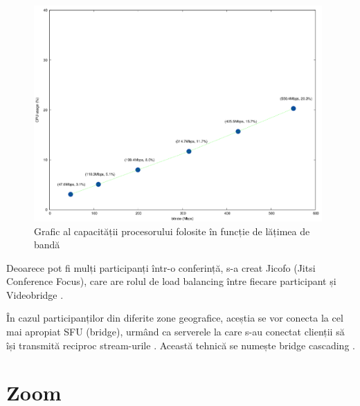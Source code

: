 \begin{figure}[H]
    \centering
    \includegraphics[width=11cm,trim={0 0 0 3cm}, clip]{figures/jitsi_videobridge_cpu.png}
    \caption{Grafic al capacității procesorului folosite în funcție de lățimea de bandă}
    \label{JitsiVideobridgeCPU}
\end{figure}
\indent \par Deoarece pot fi mulți participanți într-o conferință, s-a creat Jicofo (Jitsi Conference Focus), care are rolul de load balancing între fiecare participant și Videobridge \cite{JitsiArchitecture}.
\indent \par În cazul participanților din diferite zone geografice, aceștia se vor conecta la cel mai apropiat SFU (bridge), urmând ca serverele la care s-au conectat clienții să își transmită reciproc stream-urile \cite{JitsiBridgeCascading}. Această tehnică se numește bridge cascading \cite{JitsiBridgeCascading}.

\section{Zoom}
\label{chap:ch4sec3}


